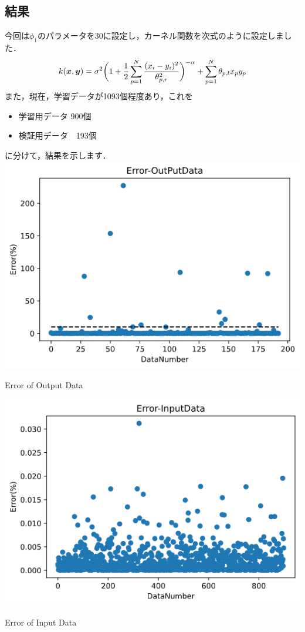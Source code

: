 \documentclass[11pt]{jsarticle}
\begin{document}
		\subsection{結果}
			今回は$ \phi_1 $のパラメータを$ 30 $に設定し，カーネル関数を次式のように設定しました．
			\begin{equation}\label{eq:KernelForExperiment}
				k(\boldsymbol{x},\boldsymbol{y}) = \sigma^2 \bigg( 1 + \frac{1}{2} \sum_{p=1}^{N} \frac{(x_i-y_i)^2}{\theta_{p,r}^2} \bigg)^{- \alpha} + \sum_{p=1}^{N} \theta_{p,l} x_p y_p
			\end{equation}
			また，現在，学習データが1093個程度あり，これを
			\begin{itemize}
				\item 学習用データ 900個
				\item 検証用データ　193個
			\end{itemize}
			に分けて，結果を示します．
			\bfig[H]
			\centering
			\centering
			\includegraphics[scale=0.4]{./figure/ErrorForOutputDataGraph.png}
			\caption{Error of Output Data}
			\emini
			\centering
			\includegraphics[scale=0.4]{./figure/ErrorForInputDataGraph.png}
			\caption{Error of Input Data}
			\emini
			\efig
			
\end{document}
